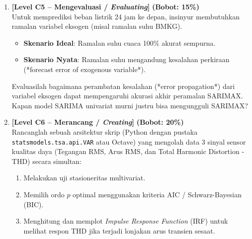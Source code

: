\documentclass[11pt,a4paper]{article}
\begin{document}
\begin{enumerate}[leftmargin=1.5em, label=\textbf{Soal \arabic*.}]
    \item \textbf{[Level C5 -- Mengevaluasi / \textit{Evaluating}]} \hfill \textbf{(Bobot: 15\%)} \\
    Untuk memprediksi beban listrik 24 jam ke depan, insinyur membutuhkan ramalan variabel eksogen (misal ramalan suhu BMKG).
    \begin{itemize}
        \item \textbf{Skenario Ideal}: Ramalan suhu cuaca 100\% akurat sempurna.
        \item \textbf{Skenario Nyata}: Ramalan suhu mengandung kesalahan perkiraan (*forecast error of exogenous variable*).
    \end{itemize}
    Evaluasilah bagaimana perambatan kesalahan (*error propagation*) dari variabel eksogen dapat mempengaruhi akurasi akhir peramalan SARIMAX. Kapan model SARIMA univariat murni justru bisa mengungguli SARIMAX?

    \vspace{0.4cm}

    \item \textbf{[Level C6 -- Merancang / \textit{Creating}]} \hfill \textbf{(Bobot: 20\%)} \\
    Rancanglah sebuah arsitektur skrip (Python dengan pustaka \texttt{statsmodels.tsa.api.VAR} atau Octave) yang mengolah data 3 sinyal sensor kualitas daya (Tegangan RMS, Arus RMS, dan Total Harmonic Distortion - THD) secara simultan:
    \begin{enumerate}[label=\alph*.]
        \item Melakukan uji stasioneritas multivariat.
        \item Memilih ordo $p$ optimal menggunakan kriteria AIC / Schwarz-Bayesian (BIC).
        \item Menghitung dan memplot \textit{Impulse Response Function} (IRF) untuk melihat respon THD jika terjadi lonjakan arus transien sesaat.
    \end{enumerate}

\end{enumerate}
\end{document}
